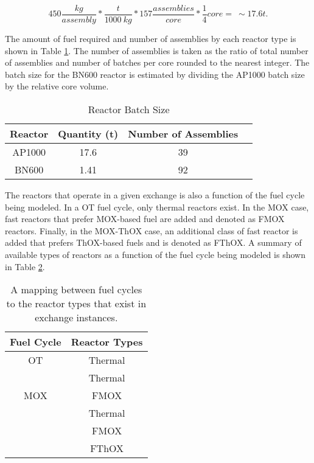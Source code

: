\begin{equation}
   450 \frac{kg}{assembly} * \frac{t}{1000 \: kg} * 157 \frac{assemblies}{core}
   * \frac{1}{4} core = \: \sim 17.6 t.
\end{equation}

The amount of fuel required and number of assemblies by each reactor type is
shown in Table \ref{tbl:rx_batch}. The number of assemblies is taken as the
ratio of total number of assemblies and number of batches per core rounded to
the nearest integer. The batch size for the BN600 reactor is estimated by
dividing the AP1000 batch size by the relative core volume.

\begin{table}[h]
\centering
\caption{Reactor Batch Size}
\label{tbl:rx_batch}
\begin{tabular}{|c|c|c|c|}
\hline
Reactor & Quantity (t) & Number of Assemblies \\ \hline
AP1000  & 17.6          & 39 \\ \hline
BN600   & 1.41          & 92 \\ \hline
\end{tabular}
\end{table}

The reactors that operate in a given exchange is also a function of the fuel
cycle being modeled. In a OT fuel cycle, only thermal reactors exist. In the MOX
case, fast reactors that prefer MOX-based fuel are added and denoted as FMOX
reactors. Finally, in the MOX-ThOX case, an additional class of fast reactor is
added that prefers ThOX-based fuels and is denoted as FThOX. A summary of
available types of reactors as a function of the fuel cycle being modeled is
shown in Table \ref{tbl:fc_to_rxs}. 

\begin{table}[h]
\centering
\caption{A mapping between fuel cycles to the reactor types that exist in exchange instances.}
\label{tbl:fc_to_rxs}
\begin{tabular}{|c|c|}
\hline
Fuel Cycle            & Reactor Types \\ \hline
OT                    & Thermal         \\ \hline
\multirow{3}{*}{MOX}  & Thermal         \\  
                      & FMOX        \\ \hline
\multirow{4}{*}{ThOX} & Thermal         \\  
                      & FMOX        \\  
                      & FThOX       \\ \hline
\end{tabular}
\end{table}

